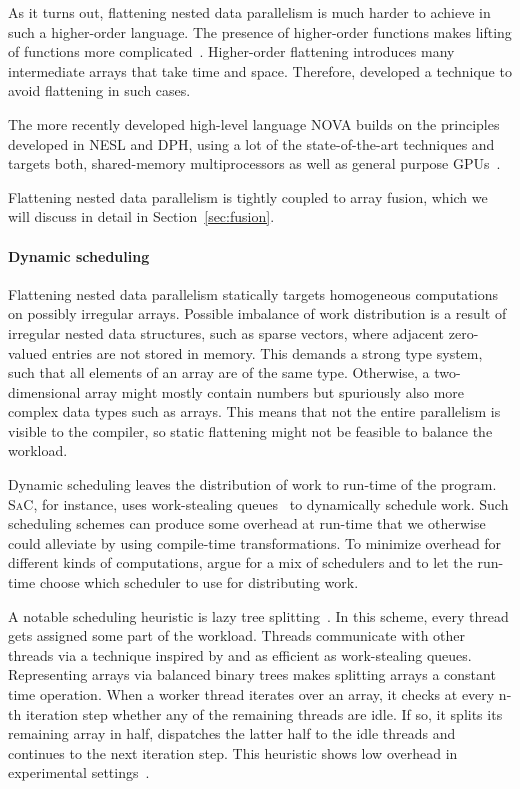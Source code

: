 \documentclass[a4paper]{article}
\newcommand{\sac}{S\textsc{a}C}
\begin{document}
As it turns out, flattening nested data parallelism is much harder to achieve in such a higher-order language. The presence of higher-order functions makes lifting of functions more complicated~\cite{Lippmeier:2012:WEH:2364527.2364564}. Higher-order flattening introduces many intermediate arrays that take time and space. Therefore, \citet{Keller:2012:VA:2364506.2364512} developed a technique to avoid flattening in such cases.

The more recently developed high-level language NOVA builds on the principles developed in NESL and DPH, using a lot of the state-of-the-art techniques and targets both, shared-memory multiprocessors as well as general purpose GPUs~\cite{Collins:2014:NFL:2627373.2627375}.

Flattening nested data parallelism is tightly coupled to array fusion,
which we will discuss in detail in Section~\ref{sec:fusion}.

\paragraph{Dynamic scheduling}

Flattening nested data parallelism statically targets homogeneous computations on possibly irregular arrays. Possible imbalance of work distribution is a result of irregular nested data structures, such as sparse vectors, where adjacent zero-valued entries are not stored in memory. This demands a strong type system, such that all elements of an array are of the same type. Otherwise, a two-dimensional array might mostly contain numbers but spuriously also more complex data types such as arrays. This means that not the entire parallelism is visible to the compiler, so static flattening might not be feasible to balance the workload.

Dynamic scheduling leaves the distribution of work to run-time of the program. \sac{}, for instance, uses work-stealing queues~\cite{Chase2005Dynamic, Grelck:2007:SOS:1248648.1248654} to dynamically schedule work. Such scheduling schemes can produce some overhead at run-time that we otherwise could alleviate by using compile-time transformations. To minimize overhead for different kinds of computations, \citet{Fluet:2008:SFG:1411204.1411239} argue for a mix of schedulers and to let the run-time choose which scheduler to use for distributing work.

A notable scheduling heuristic is lazy tree splitting~\cite{Bergstrom:2010:LTS:1863543.1863558}. In this scheme, every thread gets assigned some part of the workload. Threads communicate with other threads via a technique inspired by and as efficient as work-stealing queues. Representing arrays via balanced binary trees makes splitting arrays a constant time operation. When a worker thread iterates over an array, it checks at every n-th iteration step whether any of the remaining threads are idle. If so, it splits its remaining array in half, dispatches the latter half to the idle threads and continues to the next iteration step. This heuristic shows low overhead in experimental settings~\cite{Bergstrom:2010:LTS:1863543.1863558}.
\end{document}
